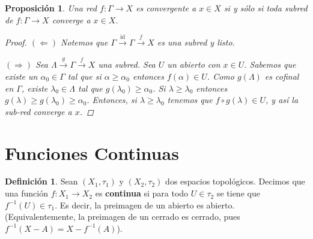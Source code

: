 \documentclass[12pt]{book}
\newtheorem{prop}[teo]{Proposición}
\theoremstyle{definition}
\newtheorem{defn}[teo]{Definición}
\DeclareMathOperator{\id}{id}
\begin{document}
\begin{prop}
Una red $f:\Gamma\to X$ es convergente a $x\in X$ si y sólo si toda subred de $f:\Gamma\to X$ converge a $x\in X$.
\begin{proof}
$(\Longleftarrow)$ Notemos que $\Gamma\stackrel{\id}{\longrightarrow}\Gamma\stackrel{f}{\longrightarrow}X$ es una subred y listo.

$(\Longrightarrow)$ Sea $\Lambda\stackrel{g}{\longrightarrow} \Gamma\stackrel{f}{\longrightarrow} X$ una subred. Sea $U$ un abierto con $x\in U$. Sabemos que existe un $\alpha_0\in\Gamma$ tal que si $\alpha\geq \alpha_0$ entonces $f(\alpha)\in U$. Como $g(\Lambda)$ es cofinal en $\Gamma$, existe $\lambda_0\in \Lambda$ tal que $g(\lambda_0)\geq \alpha_0$. Si $\lambda\geq \lambda_0$ entonces $g(\lambda)\geq g(\lambda_0)\geq \alpha_0$. Entonces, si $\lambda\geq \lambda_0$ tenemos que $f\circ g (\lambda)\in U$, y así la sub-red converge a $x$.
\end{proof}
\end{prop}

\section{Funciones Continuas}

\begin{defn}
Sean $(X_1,\tau_1)$ y $(X_2,\tau_2)$ dos espacios topológicos. Decimos que una función $f:X_1\to X_2$ es \textbf{continua} si para todo $U\in\tau_2$ se tiene que $f^{-1}(U)\in \tau_1$. Es decir, la preimagen de un abierto es abierto. (Equivalentemente, la preimagen de un cerrado es cerrado, pues $f^{-1}(X-A) = X - f^{-1}(A)$).
\end{defn}
\end{document}
